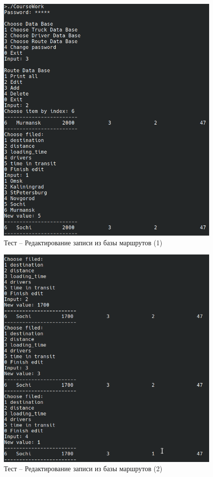 \begin{figure}[H]
	\centering
	\includegraphics[width=0.8\linewidth]{photo/tests/admin/route_db_edit_1}
	\caption{Тест -- Редактирование записи из базы маршрутов (1)}
	\label{route_db_edit_1}
\end{figure}

\begin{figure}[H]
	\centering
	\includegraphics[width=0.8\linewidth]{photo/tests/admin/route_db_edit_2}
	\caption{Тест -- Редактирование записи из базы маршрутов (2)}
	\label{route_db_edit_2}
\end{figure}

